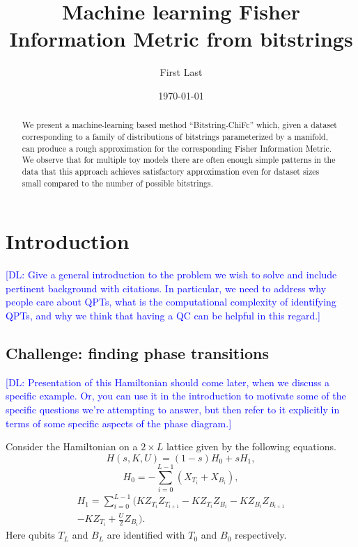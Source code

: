 \documentclass[american,aps,pra,reprint,floatfix,nofootinbib,superscriptaddress]{revtex4-2}
\newcommand{\DL}[1]{\textcolor{blue}{[DL: #1]}}
\begin{document}
\title{Machine learning Fisher Information Metric from bitstrings}
\author{First Last}

\date{\today}

\begin{abstract}
We present a machine-learning based method ``Bitstring-ChiFc'' which,
given a dataset corresponding to a family of distributions of bitstrings
parameterized by a manifold, can produce a rough approximation
for the corresponding Fisher Information Metric.
We observe that for multiple toy models there are often enough simple patterns
in the data that this approach
achieves satisfactory approximation even for dataset sizes small
compared to the number of possible bitstrings.
\end{abstract}

\maketitle

\section{Introduction}
\DL{Give a general introduction to the problem we wish to solve and include pertinent background with citations. In particular, we need to address why people care about QPTs, what is the computational complexity of identifying QPTs, and why we think that having a QC can be helpful in this regard.}

\subsection{Challenge: finding phase transitions}

\DL{Presentation of this Hamiltonian should come later, when we discuss a specific example. Or, you can use it in the introduction to motivate some of the specific questions we're attempting to answer, but then refer to it explicitly in terms of some specific aspects of the phase diagram.}

Consider the Hamiltonian
on a $2 \times L$ lattice given by the following equations.
\begin{equation}
  \label{eq:Hladder.1}
  H(s,K,U) = (1-s) H_0 + s H_1,
\end{equation}
\begin{equation}
  \label{eq:Hladder.2}
  H_0 = -\sum_{i=0}^{L-1} (X_{T_i} + X_{B_i}),
\end{equation}
\begin{multline}
  \label{eq:Hladder.3}
  H_1 = \sum_{i=0}^{L-1} \biggl(K Z_{T_i} Z_{T_{i+1}} - K Z_{T_i} Z_{B_i}
    - K Z_{B_i} Z_{B_{i+1}} \\
  - K Z_{T_i} + \frac{U}{2} Z_{B_i}\biggr).
\end{multline}
Here qubits $T_L$ and $B_L$ are identified with $T_0$ and $B_0$ respectively.
\end{document}
